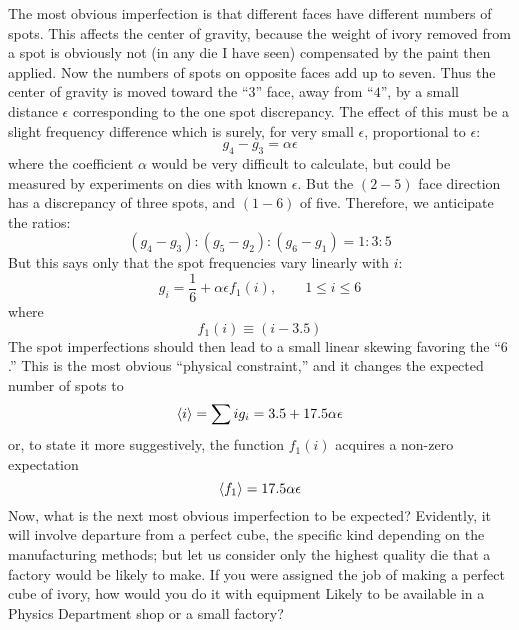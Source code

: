 The most obvious imperfection is that different faces have different numbers of spots.
This affects the center of gravity, because the weight of ivory removed from a spot is obviously not (in any die I have seen) compensated by the paint then applied.
Now the numbers of spots on opposite faces add up to seven.
Thus the center of gravity is moved toward the ``$3$'' face, away from ``$4$'', by a small distance $\epsilon$ corresponding to the one spot discrepancy.
The effect of this must be a slight frequency difference which is surely, for very small $\epsilon$, proportional to $\epsilon$:
\begin{equation}
	\label{B41}
	g_4 - g_3 = \alpha \epsilon
\end{equation}
where the coefficient $\alpha$ would be very difficult to calculate, but could be measured by experiments on dies with known $\epsilon$.
But the $(2{-}5)$ face direction has a discrepancy of three spots, and $(1{-}6)$ of five.
Therefore, we anticipate the ratios:
\begin{equation}
	\label{B42}
	(g_4 - g_3) : (g_5 - g_2) : (g_6 - g_1) = 1 : 3 : 5
\end{equation}
But this says only that the spot frequencies vary linearly with $i$:
\begin{equation}
	\label{B43}
	g_i =  \frac{1}{6} + \alpha \epsilon f_1(i), \qquad 1 \leq i \leq 6
\end{equation}
where
\begin{equation}
	\label{B44}
	f_1(i) \equiv (i - 3.5)
\end{equation}
The spot imperfections should then lead to a small linear skewing favoring the ``$6$.''
This is the most obvious ``physical constraint,'' and it changes the expected number of spots to
\begin{equation}
	\label{B45}
	\langle i\rangle = \sum i g_i = 3.5 + 17.5\alpha\epsilon
\end{equation}
or, to state it more suggestively, the function $f_1(i)$ acquires a non-zero expectation
\begin{equation}
	\label{B46}
	\langle f_1\rangle = 17.5 \alpha\epsilon
\end{equation}
Now, what is the next most obvious imperfection to be expected?
Evidently, it will involve departure from a perfect cube, the specific kind depending on the manufacturing methods; but let us consider only the highest quality die that a factory would be likely to make.
If you were assigned the job of making a perfect cube of ivory, how would you do it with equipment Likely to be available in a Physics Department shop or a small factory?

